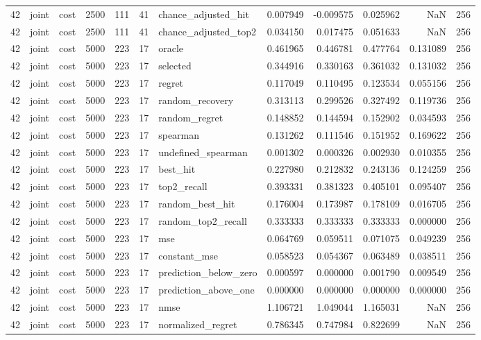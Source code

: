 \begin{tabular}{rllrrrlrrrrr}
42 & joint & cost & 2500 & 111 & 41 & chance_adjusted_hit & 0.007949 & -0.009575 & 0.025962 & NaN & 256 \\
42 & joint & cost & 2500 & 111 & 41 & chance_adjusted_top2 & 0.034150 & 0.017475 & 0.051633 & NaN & 256 \\
42 & joint & cost & 5000 & 223 & 17 & oracle & 0.461965 & 0.446781 & 0.477764 & 0.131089 & 256 \\
42 & joint & cost & 5000 & 223 & 17 & selected & 0.344916 & 0.330163 & 0.361032 & 0.131032 & 256 \\
42 & joint & cost & 5000 & 223 & 17 & regret & 0.117049 & 0.110495 & 0.123534 & 0.055156 & 256 \\
42 & joint & cost & 5000 & 223 & 17 & random_recovery & 0.313113 & 0.299526 & 0.327492 & 0.119736 & 256 \\
42 & joint & cost & 5000 & 223 & 17 & random_regret & 0.148852 & 0.144594 & 0.152902 & 0.034593 & 256 \\
42 & joint & cost & 5000 & 223 & 17 & spearman & 0.131262 & 0.111546 & 0.151952 & 0.169622 & 256 \\
42 & joint & cost & 5000 & 223 & 17 & undefined_spearman & 0.001302 & 0.000326 & 0.002930 & 0.010355 & 256 \\
42 & joint & cost & 5000 & 223 & 17 & best_hit & 0.227980 & 0.212832 & 0.243136 & 0.124259 & 256 \\
42 & joint & cost & 5000 & 223 & 17 & top2_recall & 0.393331 & 0.381323 & 0.405101 & 0.095407 & 256 \\
42 & joint & cost & 5000 & 223 & 17 & random_best_hit & 0.176004 & 0.173987 & 0.178109 & 0.016705 & 256 \\
42 & joint & cost & 5000 & 223 & 17 & random_top2_recall & 0.333333 & 0.333333 & 0.333333 & 0.000000 & 256 \\
42 & joint & cost & 5000 & 223 & 17 & mse & 0.064769 & 0.059511 & 0.071075 & 0.049239 & 256 \\
42 & joint & cost & 5000 & 223 & 17 & constant_mse & 0.058523 & 0.054367 & 0.063489 & 0.038511 & 256 \\
42 & joint & cost & 5000 & 223 & 17 & prediction_below_zero & 0.000597 & 0.000000 & 0.001790 & 0.009549 & 256 \\
42 & joint & cost & 5000 & 223 & 17 & prediction_above_one & 0.000000 & 0.000000 & 0.000000 & 0.000000 & 256 \\
42 & joint & cost & 5000 & 223 & 17 & nmse & 1.106721 & 1.049044 & 1.165031 & NaN & 256 \\
42 & joint & cost & 5000 & 223 & 17 & normalized_regret & 0.786345 & 0.747984 & 0.822699 & NaN & 256 \\

\end{tabular}
